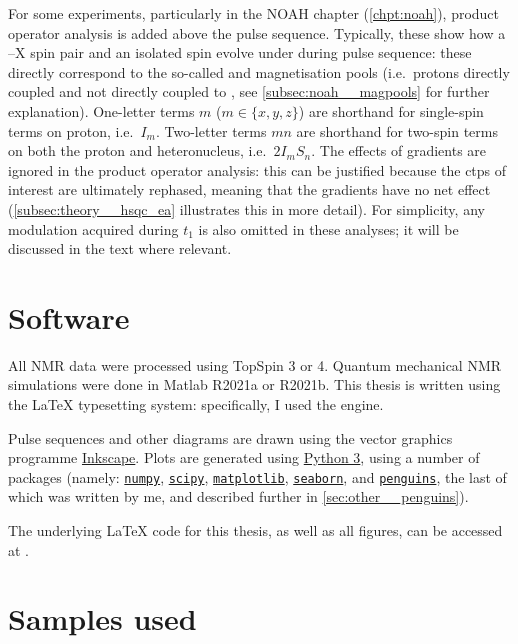 For some experiments, particularly in the NOAH chapter (\cref{chpt:noah}), product operator analysis is added above the pulse sequence.
Typically, these show how a \proton{}--X spin pair and an isolated \proton{} spin evolve under during pulse sequence: these directly correspond to the so-called  and  magnetisation pools (i.e.\ protons directly coupled and not directly coupled to \carbon{}, see \cref{subsec:noah__magpools} for further explanation).
One-letter terms $m$ ($m \in \{x, y, z\}$) are shorthand for single-spin terms on proton, i.e.\ $I_m$.
Two-letter terms $mn$ are shorthand for two-spin terms on both the proton and heteronucleus, i.e.\ $2I_mS_n$.
The effects of gradients are ignored in the product operator analysis: this can be justified because the \acp{ctp} of interest are ultimately rephased, meaning that the gradients have no net effect (\cref{subsec:theory__hsqc_ea} illustrates this in more detail).
For simplicity, any modulation acquired during $t_1$ is also omitted in these analyses; it will be discussed in the text where relevant.

\section*{Software}

All NMR data were processed using TopSpin 3 or 4.
Quantum mechanical NMR simulations were done in Matlab R2021a or R2021b.
This thesis is written using the \LaTeX{} typesetting system: specifically, I used the \LuaLaTeX{} engine.

Pulse sequences and other diagrams are drawn using the vector graphics programme \href{https://inkscape.org/}{Inkscape}.
Plots are generated using \href{https://www.python.org/}{Python 3}, using a number of packages (namely: \href{https://github.com/numpy/numpy}{\texttt{numpy}}, \href{https://github.com/scipy/scipy}{\texttt{scipy}}, \href{https://github.com/matplotlib/matplotlib}{\texttt{matplotlib}}, \href{https://github.com/mwaskom/seaborn}{\texttt{seaborn}}, and \href{https://github.com/yongrenjie/penguins}{\texttt{penguins}}, the last of which was written by me, and described further in \cref{sec:other__penguins}).

The underlying \LaTeX{} code for this thesis, as well as all figures, can be accessed at .

\section*{Samples used}

